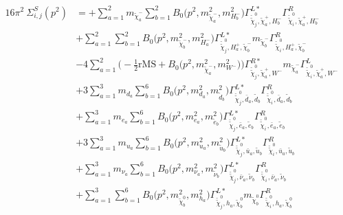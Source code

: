 \begin{itemize}
\begin{align} 
16\pi^2 \ \Sigma^S_{i,j}(p^2) &= +\sum_{a=1}^{2}m_{\tilde{\chi}^-_{{a}}} \sum_{b=1}^{2}{B_0\Big(p^{2},m^2_{\tilde{\chi}^-_{{a}}},m^2_{H^-_{{b}}}\Big)} {\Gamma^{L*}_{\check{\tilde{\chi}}^0_{{j}},\tilde{\chi}^+_{{a}},H^-_{{b}}}} {\Gamma^R_{\check{\tilde{\chi}}^0_{{i}},\tilde{\chi}^+_{{a}},H^-_{{b}}}}  \nonumber \\ 
 &+\sum_{a=1}^{2}\sum_{b=1}^{2}{B_0\Big(p^{2},m^2_{\tilde{\chi}^-_{{b}}},m^2_{H^-_{{a}}}\Big)} {\Gamma^{L*}_{\check{\tilde{\chi}}^0_{{j}},H^+_{{a}},\tilde{\chi}^-_{{b}}}} m_{\tilde{\chi}^-_{{b}}} {\Gamma^R_{\check{\tilde{\chi}}^0_{{i}},H^+_{{a}},\tilde{\chi}^-_{{b}}}} \nonumber \\ 
 &-4 \sum_{a=1}^{2}\Big(-\frac{1}{2} \text{rMS}  + {B_0\Big(p^{2},m^2_{\tilde{\chi}^-_{{a}}},m^2_{W^-}\Big)}\Big){\Gamma^{R*}_{\check{\tilde{\chi}}^0_{{j}},\tilde{\chi}^+_{{a}},W^-}} m_{\tilde{\chi}^-_{{a}}} {\Gamma^L_{\check{\tilde{\chi}}^0_{{i}},\tilde{\chi}^+_{{a}},W^-}}  \nonumber \\ 
 &+3 \sum_{a=1}^{3}m_{d_{{a}}} \sum_{b=1}^{6}{B_0\Big(p^{2},m^2_{d_{{a}}},m^2_{\tilde{d}_{{b}}}\Big)} {\Gamma^{L*}_{\check{\tilde{\chi}}^0_{{j}},\bar{d}_{{a}},\tilde{d}_{{b}}}} {\Gamma^R_{\check{\tilde{\chi}}^0_{{i}},\bar{d}_{{a}},\tilde{d}_{{b}}}}   \nonumber \\ 
 &+\sum_{a=1}^{3}m_{e_{{a}}} \sum_{b=1}^{6}{B_0\Big(p^{2},m^2_{e_{{a}}},m^2_{\tilde{e}_{{b}}}\Big)} {\Gamma^{L*}_{\check{\tilde{\chi}}^0_{{j}},\bar{e}_{{a}},\tilde{e}_{{b}}}} {\Gamma^R_{\check{\tilde{\chi}}^0_{{i}},\bar{e}_{{a}},\tilde{e}_{{b}}}}  \nonumber \\ 
 &+3 \sum_{a=1}^{3}m_{u_{{a}}} \sum_{b=1}^{6}{B_0\Big(p^{2},m^2_{u_{{a}}},m^2_{\tilde{u}_{{b}}}\Big)} {\Gamma^{L*}_{\check{\tilde{\chi}}^0_{{j}},\bar{u}_{{a}},\tilde{u}_{{b}}}} {\Gamma^R_{\check{\tilde{\chi}}^0_{{i}},\bar{u}_{{a}},\tilde{u}_{{b}}}}   \nonumber \\ 
 &+\sum_{a=1}^{3}m_{\nu_{{a}}} \sum_{b=1}^{6}{B_0\Big(p^{2},m^2_{\nu_{{a}}},m^2_{\tilde{\nu}_{{b}}}\Big)} {\Gamma^{L*}_{\check{\tilde{\chi}}^0_{{j}},\bar{\nu}_{{a}},\tilde{\nu}_{{b}}}} {\Gamma^R_{\check{\tilde{\chi}}^0_{{i}},\bar{\nu}_{{a}},\tilde{\nu}_{{b}}}}  \nonumber \\ 
 &+\sum_{a=1}^{3}\sum_{b=1}^{6}{B_0\Big(p^{2},m^2_{\tilde{\chi}^0_{{b}}},m^2_{h_{{a}}}\Big)} {\Gamma^{L*}_{\check{\tilde{\chi}}^0_{{j}},h_{{a}},\tilde{\chi}^0_{{b}}}} m_{\tilde{\chi}^0_{{b}}} {\Gamma^R_{\check{\tilde{\chi}}^0_{{i}},h_{{a}},\tilde{\chi}^0_{{b}}}} \nonumber \\ 

\end{align}
\end{itemize}
